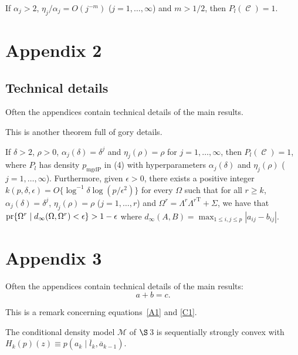 \documentclass[lineno]{biometrika}
\def\T{{ \mathrm{\scriptscriptstyle T} }}
\DeclareMathOperator{\Thetabb}{\mathcal{C}}
\begin{document}
\begin{lemma}\label{lem:gdp-1}
If $\alpha_j > 2$, $\eta_j/\alpha_j = O(j^{-m})$ ($j=1, \ldots,
\infty$) and $m > 1/2$, then $P_{l} (\Thetabb)= 1$.
\end{lemma}



\vspace*{-10pt}
\appendixtwo
\section*{Appendix 2}
\subsection*{Technical details}

Often the appendices contain technical details of the main results.

\begin{theorem}
This is another theorem full of gory details.
\end{theorem}

\begin{lemma}\label{lem:gdp-2}
If $\delta > 2$, $\rho > 0$, $\alpha_j(\delta) = \delta^j$ and
$\eta_j(\rho) = \rho$ for $j = 1, \ldots, \infty$, then $P_{l}
(\Thetabb) = 1$, where $P_{l}$ has density $p_{\mathrm{mgdP}}$ in
(4) with hyperparameters $\alpha_j(\delta)$ and
$\eta_j(\rho)$ ($j = 1, \ldots, \infty$). Furthermore, given
$\epsilon > 0$, there exists a positive integer $k(p, \delta,
\epsilon)= O\{\log^{-1} \delta \log ({p}/{\epsilon^2})\}$ for every
$\Omega$ such that for all $r \geq k$, $\alpha_j(\delta)=\delta^j$,
$\eta_j(\rho)=\rho$ ($j=1, \ldots, r$) and $\Omega^{r} = \Lambda^{r}
{\Lambda^r}^{\T} + \Sigma$, we have that ${\rm pr}\{\Omega^{r} \mid
d_{\infty}(\Omega, \Omega^{r}) < \epsilon\} > 1 - \epsilon$ where
$d_{\infty}(A, B) = {\max}_{1 \leq i,j \leq p}|a_{ij} - b_{ij}|$.
\end{lemma}

\vspace*{-10pt}
\appendixthree
\section*{Appendix 3}

Often the appendices contain technical details of the main results:
\begin{equation}
\label{C1}
a + b = c.
\end{equation}

\begin{remark}
This is a remark concerning equations~\eqref{A1} and \eqref{C1}.
\end{remark}

\begin{lemma}\label{facstrong}
The conditional density model $\mathcal{M}$ of $\S$\,3 is sequentially strongly convex with $H_{k}(p)\left( z\right)
\equiv p\left( a_{k}\mid \overline{l}_{k},\overline{a}_{k-1}\right) $.\vspace*{-10pt}
\end{lemma}




 
\end{document}
